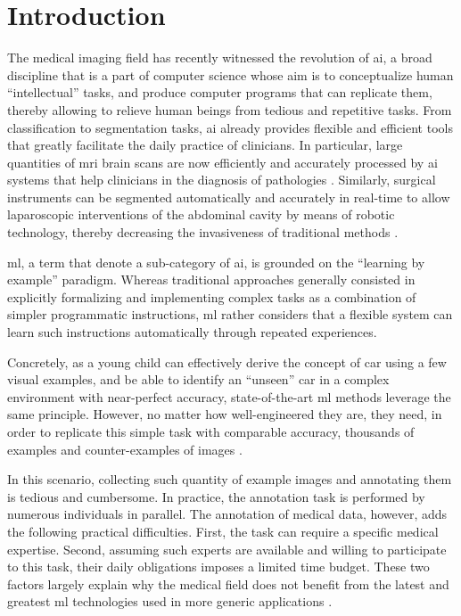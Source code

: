 
\chapter{Introduction}
\label{intro}

The medical imaging field has recently witnessed the revolution of \gls{ai}, a broad discipline that is a part of computer science whose aim is to conceptualize human ``intellectual'' tasks, and produce computer programs that can replicate them, thereby allowing to relieve human beings from tedious and repetitive tasks.
From classification to segmentation tasks, \gls{ai} already provides flexible and efficient tools that greatly facilitate the daily practice of clinicians.
In particular, large quantities of \gls{mri} brain scans are now efficiently and accurately processed by \gls{ai} systems that help clinicians in the diagnosis of pathologies \cite{sun19}.
Similarly, surgical instruments can be segmented automatically and accurately in real-time to allow laparoscopic interventions of the abdominal cavity by means of robotic technology, thereby decreasing the invasiveness of traditional methods \cite{davinci}.

\Gls{ml}, a term that denote a sub-category of \gls{ai}, is grounded on the ``learning by example'' paradigm.
Whereas traditional approaches generally consisted in explicitly formalizing and implementing complex tasks as a combination of simpler programmatic instructions,
\gls{ml} rather considers that a flexible system can learn such instructions automatically through repeated experiences.

Concretely, as a young child can effectively derive the concept of car using a few visual examples, and be able to identify an ``unseen'' car in a complex environment with near-perfect accuracy,
state-of-the-art \gls{ml} methods leverage the same principle.
However, no matter how well-engineered they are, they need, in order to replicate this simple task with comparable accuracy, thousands of examples and counter-examples of images \cite{ILSVRC15}.

In this scenario, collecting such quantity of example images and annotating them is tedious and cumbersome.
In practice, the annotation task is performed by numerous individuals in parallel.
The annotation of medical data, however, adds the following practical difficulties.
First, the task can require a specific medical expertise.
Second, assuming such experts are available and willing to participate to this task, their daily obligations imposes a limited time budget.
These two factors largely explain why the medical field does not benefit from the latest and greatest \gls{ml} technologies used in more generic applications \cite{orting19}.


